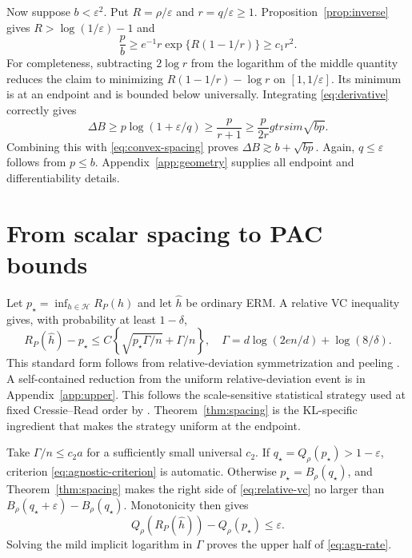 \documentclass{article}
\theoremstyle{remark}
\newcommand{\cH}{\mathcal H}
\newcommand{\eps}{\varepsilon}
\begin{document}
Now suppose $b<\eps^2$.  Put $R=\rho/\eps$ and $r=q/\eps\ge1$. Proposition~\ref{prop:inverse} gives $R>\log(1/\eps)-1$ and
\begin{equation}
 \frac pb\ge e^{-1}r\exp\{R(1-1/r)\}\ge c_1r^2.
 \label{eq:ratio-pb}
\end{equation}
For completeness, subtracting $2\log r$ from the logarithm of the middle quantity reduces the claim to minimizing $R(1-1/r)-\log r$ on $[1,1/\eps]$.  Its minimum is at an endpoint and is bounded below universally.  Integrating \eqref{eq:derivative} correctly gives
\begin{equation}
 \Delta B\ge p\log(1+\eps/q)
 \ge\frac{p}{r+1}\ge\frac{p}{2r}gtrsim\sqrt{bp}.
 \label{eq:integrated-derivative}
\end{equation}
Combining this with \eqref{eq:convex-spacing} proves $\Delta B\gtrsim b+\sqrt{bp}$.  Again, $q\le\eps$ follows from $p\le b$. Appendix~\ref{app:geometry} supplies all endpoint and differentiability details.

\section{From scalar spacing to PAC bounds}
\label{sec:pac}

Let $p_\star=\inf_{h\in\cH}R_P(h)$ and let $\widehat h$ be ordinary ERM.  A relative VC inequality gives, with probability at least $1-\delta$,
\begin{equation}
 R_P(\widehat h)-p_\star
 \le C\left\{\sqrt{p_\star\Gamma/n}+\Gamma/n\right\},
 \quad
 \Gamma=d\log(2en/d)+\log(8/\delta).
 \label{eq:relative-vc}
\end{equation}
This standard form follows from relative-deviation symmetrization and peeling \citep{vapnik1971uniform,boucheron2005classification}.  A self-contained reduction from the uniform relative-deviation event is in Appendix~\ref{app:upper}.  This follows the scale-sensitive statistical strategy used at fixed Cressie--Read order by \citet{aignerhorev2026cressie}.  Theorem~\ref{thm:spacing} is the KL-specific ingredient that makes the strategy uniform at the endpoint.

Take $\Gamma/n\le c_2a$ for a sufficiently small universal $c_2$.  If $q_\star=Q_\rho(p_\star)>1-\eps$, criterion \eqref{eq:agnostic-criterion} is automatic.  Otherwise $p_\star=B_\rho(q_\star)$, and Theorem~\ref{thm:spacing} makes the right side of \eqref{eq:relative-vc} no larger than $B_\rho(q_\star+\eps)-B_\rho(q_\star)$.  Monotonicity then gives \[ Q_\rho(R_P(\widehat h))-Q_\rho(p_\star)\le\eps. \] Solving the mild implicit logarithm in $\Gamma$ proves the upper half of \eqref{eq:agn-rate}.
\end{document}
